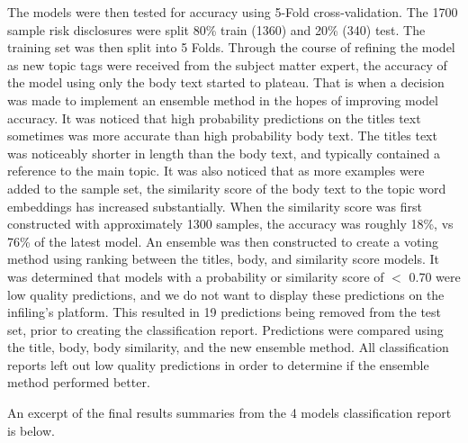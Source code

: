 \documentclass[11pt]{article}
\begin{document}
The models were then tested for accuracy using 5-Fold cross-validation.  The 1700 sample risk disclosures were split 80\% train (1360) and 20\% (340) test.  The training set was then split into 5 Folds.  Through the course of refining the model as new topic tags were received from the subject matter expert, the accuracy of the model using only the body text started to plateau.  That is when a decision was made to implement an ensemble method in the hopes of improving model accuracy.  It was noticed that high probability predictions on the titles text sometimes was more accurate than high probability body text.  The titles text was noticeably shorter in length than the body text, and typically contained a reference to the main topic.  It was also noticed that as more examples were added to the sample set, the similarity score of the body text to the topic word embeddings has increased substantially.  When the similarity score was first constructed with approximately 1300 samples, the accuracy was roughly 18\%, vs 76\% of the latest model.  An ensemble was then constructed to create a voting method using ranking between the titles, body, and similarity score models.  It was determined that models with a probability or similarity score of $<$ 0.70 were low quality predictions, and we do not want to display these predictions on the infiling's platform. This resulted in 19 predictions being removed from the test set, prior to creating the classification report.  Predictions were compared using the title, body, body similarity, and the new ensemble method. All classification reports left out low quality predictions in order to determine if the ensemble method performed better.

\vspace{5 mm}

An excerpt of the final results summaries from the 4 models classification report is below.
\end{document}
